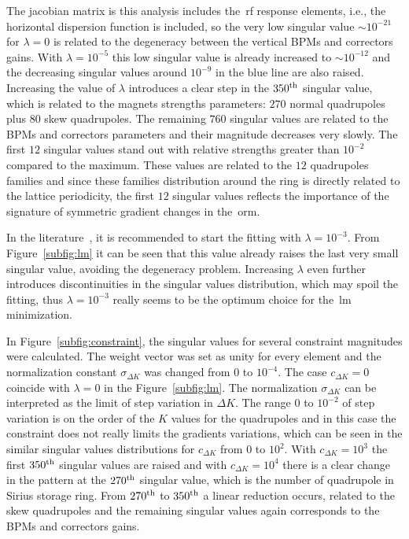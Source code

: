 The jacobian matrix is this analysis includes the~\gls{rf} response elements, i.e., the horizontal dispersion function is included, so the very low singular value $\sim10^{-21}$ for $\lambda = 0$ is related to the degeneracy between the vertical BPMs and correctors gains. With $\lambda = 10^{-5}$ this low singular value is already increased to $\sim10^{-12}$ and the decreasing singular values around $10^{-9}$ in the blue line are also raised. Increasing the value of $\lambda$ introduces a clear step in the $350\textsuperscript{th}$ singular value, which is related to the magnets strengths parameters: $270$ normal quadrupoles plus $80$ skew quadrupoles. The remaining $760$ singular values are related to the BPMs and correctors parameters and their magnitude decreases very slowly. The first $12$ singular values stand out with relative strengths greater than $10^{-2}$ compared to the maximum. These values are related to the $12$ quadrupoles families and since these families distribution around the ring is directly related to the lattice periodicity, the first $12$ singular values reflects the importance of the signature of symmetric gradient changes in the~\gls{orm}. 

In the literature~\cite{icfa_huang, huang2013}, it is recommended to start the fitting with $\lambda = 10^{-3}$. From Figure~\ref{subfig:lm} it can be seen that this value already raises the last very small singular value, avoiding the degeneracy problem. Increasing $\lambda$ even further introduces discontinuities in the singular values distribution, which may spoil the fitting, thus $\lambda = 10^{-3}$ really seems to be the optimum choice for the~\gls{lm} minimization.

In Figure~\ref{subfig:constraint}, the singular values for several constraint magnitudes were calculated. The weight vector was set as unity for every element and the normalization constant $\sigma_{\Delta K}$ was changed from $0$ to $10^{-4}$. The case $c_{\Delta K} = 0$ coincide with $\lambda = 0$ in the Figure~\ref{subfig:lm}. The normalization $\sigma_{\Delta K}$ can be interpreted as the limit of step variation in $\Delta K$. The range $0$ to $10^{-2}$ of step variation is on the order of the $K$ values for the quadrupoles and in this case the constraint does not really limits the gradients variations, which can be seen in the similar singular values distributions for $c_{\Delta K}$ from $0$ to $10^{2}$. With $c_{\Delta K}=10^{3}$ the first $350\textsuperscript{th}$ singular values are raised and with $c_{\Delta K}=10^{4}$ there is a clear change in the pattern at the $270\textsuperscript{th}$ singular value, which is the number of quadrupole in Sirius storage ring. From $270\textsuperscript{th}$ to $350\textsuperscript{th}$ a linear reduction occurs, related to the skew quadrupoles and the remaining singular values again corresponds to the BPMs and correctors gains. 

